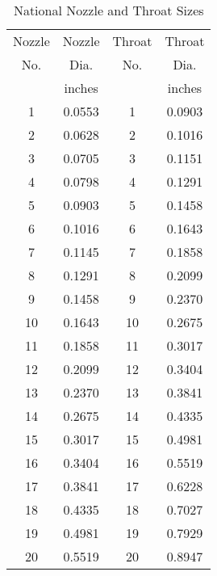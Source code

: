 \begin{table}[h]
\centering
\begin{tabular}{|c|c|c|c|}
\hline
Nozzle & Nozzle & Throat & Throat \\
No. & Dia. & No. & Dia. \\
 & inches &  & inches \\
\hline
1 & 0.0553 & 1 & 0.0903 \\
2 & 0.0628 & 2 & 0.1016 \\
3 & 0.0705 & 3 & 0.1151 \\
4 & 0.0798 & 4 & 0.1291 \\
5 & 0.0903 & 5 & 0.1458 \\
6 & 0.1016 & 6 & 0.1643 \\
7 & 0.1145 & 7 & 0.1858 \\
8 & 0.1291 & 8 & 0.2099 \\
9 & 0.1458 & 9 & 0.2370 \\
10 & 0.1643 & 10 & 0.2675 \\
11 & 0.1858 & 11 & 0.3017 \\
12 & 0.2099 & 12 & 0.3404 \\
13 & 0.2370 & 13 & 0.3841 \\
14 & 0.2675 & 14 & 0.4335 \\
15 & 0.3017 & 15 & 0.4981 \\
16 & 0.3404 & 16 & 0.5519 \\
17 & 0.3841 & 17 & 0.6228 \\
18 & 0.4335 & 18 & 0.7027 \\
19 & 0.4981 & 19 & 0.7929 \\
20 & 0.5519 & 20 & 0.8947 \\
\hline
\end{tabular}
\caption{National Nozzle and Throat Sizes}
\label{tab:national_jp_dims}
\end{table}
